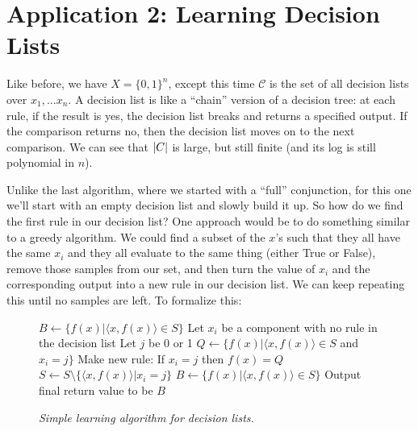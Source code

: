 \documentclass{article}
\DeclarePairedDelimiter\abs{\lvert}{\rvert}
\begin{document}
\section{Application 2: Learning Decision Lists}
Like before, we have $X = \{0, 1\}^n$, except this time $\mathcal{C}$
is the set of all decision lists over $x_1, ... x_n$. A decision list
is like a ``chain'' version of a decision tree: at each rule,
if the result is yes, the decision list breaks and returns a specified
output. If the comparison returns no, then the decision list moves on
to the next comparison. We can see that $\abs{C}$ is large, but still
finite (and its log is still polynomial in $n$).

Unlike the last algorithm, where we started with a ``full''
conjunction, for this one we'll start with an empty decision
list and slowly build it up. So how do we find the first
rule in our decision list? One approach would be to do something similar to a
greedy algorithm. We could find a subset of the $x$'s such that they all
have the same $x_i$ and they all evaluate to the same thing (either True or
False), remove those samples from our set, and then turn the value of $x_i$ and
the corresponding output into a new rule in our decision list. We can keep
repeating this until no samples are left. To formalize this:

\begin{figure}[H]
\begin{framed}
    \begin{algorithmic}
        \State $B \leftarrow \{f(x) | \langle x, f(x) \rangle \in S\}$
            \State Let $x_i$ be a component with no rule in the decision list
            \State Let $j$ be 0 or 1
            \State $Q \leftarrow \{f(x) | \langle x, f(x) \rangle \in S$ and $x_i = j \}$
                \State Make new rule: If $x_i = j$ then $f(x) = Q$
                \State $S \leftarrow S \setminus \{ \langle x, f(x) \rangle | x_i = j \}$
            \EndIf
            \State $B \leftarrow \{f(x) | \langle x, f(x) \rangle \in S\}$
        \EndWhile
        \State Output final return value to be $B$
    \end{algorithmic}
\end{framed}
\begin{center}
    \emph{Simple learning algorithm for decision lists.}
\end{center}
\end{figure}

\end{document}
